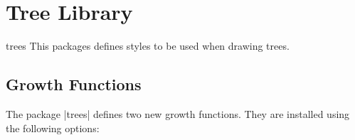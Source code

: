 %
%
%


\section{Tree Library}
\label{section-tree-library}

\begin{tikzlibrary}{trees}
    This packages defines styles to be used when drawing trees.
\end{tikzlibrary}


\subsection{Growth Functions}

The package |trees| defines two new growth functions. They are installed using
the following options:

